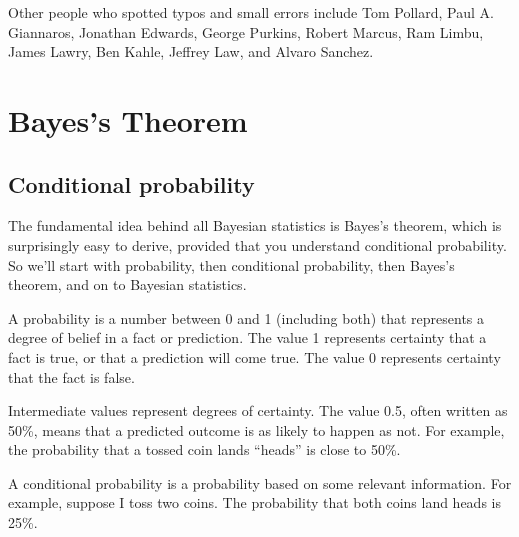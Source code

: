 \documentclass[12pt]{book}
\theoremstyle{exercise}
\begin{document}
Other people who spotted typos and small errors include
Tom Pollard,
Paul A. Giannaros,
Jonathan Edwards,
George Purkins,
Robert Marcus,
Ram Limbu,
James Lawry,
Ben Kahle,
Jeffrey Law, and
Alvaro Sanchez.

\normalsize

\clearemptydoublepage

\begin{latexonly}

\tableofcontents

\clearemptydoublepage

\end{latexonly}

\mainmatter

\newcommand{\p}[1]{\ensuremath{\mathrm{p}(#1)}}
\newcommand{\odds}[1]{\ensuremath{\mathrm{o}(#1)}}
\newcommand{\T}[1]{\mbox{#1}}
\newcommand{\AND}{~\mathrm{and}~}
\newcommand{\NOT}{\mathrm{not}~}


\chapter{Bayes's Theorem}
\label{intro}

\section{Conditional probability}

The fundamental idea behind all Bayesian statistics is Bayes's theorem,
which is surprisingly easy to derive, provided that you understand
conditional probability.  So we'll start with probability, then
conditional probability, then Bayes's theorem, and on to Bayesian
statistics.

A probability is a number between 0 and 1 (including both) that
represents a degree of belief in a fact or prediction.  The value
1 represents certainty that a fact is true, or that a prediction
will come true.  The value 0 represents certainty
that the fact is false.

Intermediate values represent degrees of certainty.  The value 0.5,
often written as 50\%, means that a predicted outcome is
as likely to happen as not.  
For example, the probability that a tossed coin lands ``heads'' is close to 50\%.

A conditional probability is a probability based on some relevant information.  For example, suppose I toss two coins.  
The probability that both coins land heads is 25\%.
\end{document}

